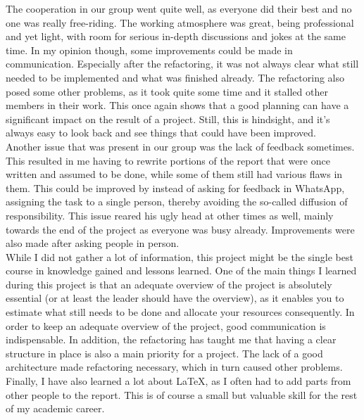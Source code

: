 The cooperation in our group went quite well, as everyone did their best and no one was really free-riding. The working atmosphere was great, being professional and yet light, with room for serious in-depth discussions and jokes at the same time. In my opinion though, some improvements could be made in communication. Especially after the refactoring, it was not always clear what still needed to be implemented and what was finished already. The refactoring also posed some other problems, as it took quite some time and it stalled other members in their work. This once again shows that a good planning can have a significant impact on the result of a project. Still, this is hindsight, and it's always easy to look back and see things that could have been improved.\\

Another issue that was present in our group was the lack of feedback sometimes. This resulted in me having to rewrite portions of the report that were once written and assumed to be done, while some of them still had various flaws in them. This could be improved by instead of asking for feedback in WhatsApp, assigning the task to a single person, thereby avoiding the so-called diffusion of responsibility. This issue reared his ugly head at other times as well, mainly towards the end of the project as everyone was busy already. Improvements were also made after asking people in person.\\

While I did not gather a lot of information, this project might be the single best course in knowledge gained and lessons learned. One of the main things I learned during this project is that an adequate overview of the project is absolutely essential (or at least the leader should have the overview), as it enables you to estimate what still needs to be done and allocate your resources consequently. In order to keep an adequate overview of the project, good communication is indispensable. In addition, the refactoring has taught me that having a clear structure in place is also a main priority for a project. The lack of a good architecture made refactoring necessary, which in turn caused other problems. Finally, I have also learned a lot about LaTeX, as I often had to add parts from other people to the report. This is of course a small but valuable skill for the rest of my academic career.\\